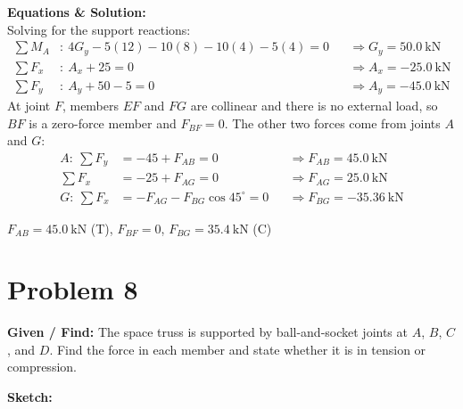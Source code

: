 \documentclass[11pt]{article}
\newcommand{\problemstart}[2]{%
    \clearpage
    \setlength{\parskip}{0.5\baselineskip}
    \setlength{\abovedisplayskip}{4pt}\setlength{\belowdisplayskip}{4pt}
    \section*{Problem #1}
    \textbf{Given / Find:} #2

    \textbf{Sketch:}
}
\begin{document}
\textbf{Equations \& Solution:}\\
Solving for the support reactions:
\begin{align*}
\textstyle\sum M_A&:\ 4G_y-5(12)-10(8)-10(4)-5(4)=0 &&\Rightarrow G_y=\SI{50.0}{\kN}\\
\textstyle\sum F_x&:\ A_x+25=0 &&\Rightarrow A_x=\SI{-25.0}{\kN}\\
\textstyle\sum F_y&:\ A_y+50-5=0 &&\Rightarrow A_y=\SI{-45.0}{\kN}
\end{align*}
At joint $F$, members $EF$ and $FG$ are collinear and there is no external load, so $BF$ is a zero-force member and $F_{BF}=0$. The other two forces come from joints $A$ and $G$:
\begin{align*}
A:\ \textstyle\sum F_y&=-45+F_{AB}=0 &&\Rightarrow F_{AB}=\SI{45.0}{\kN}\\
\textstyle\sum F_x&=-25+F_{AG}=0 &&\Rightarrow F_{AG}=\SI{25.0}{\kN}\\
G:\ \textstyle\sum F_x&=-F_{AG}-F_{BG}\cos45^\circ=0 &&\Rightarrow F_{BG}=\SI{-35.36}{\kN}
\end{align*}

\begin{finalanswer}
$F_{AB}=\SI{45.0}{\kN}$ (T), \quad $F_{BF}=0$, \quad $F_{BG}=\SI{35.4}{\kN}$ (C)
\end{finalanswer}

\problemstart{8}{The space truss is supported by ball-and-socket joints at $A$, $B$, $C$, and $D$. Find the force in each member and state whether it is in tension or compression.}
\end{document}
